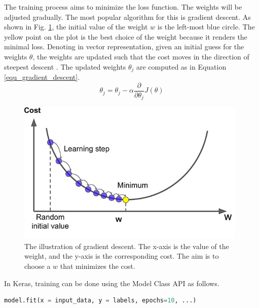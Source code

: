 The training process aims to minimize the loss function. The weights will be adjusted gradually. The most popular algorithm for this is gradient descent. As shown in Fig. \ref{fig_gradient_descent}, the initial value of the weight $w$ is the left-most blue circle. The yellow point on the plot is the best choice of the weight because it renders the minimal loss. Denoting in vector representation, given an initial guess for the weights $\theta$, the weights are updated such that the cost moves in the direction of steepest descent \cite{robbins1951stochastic}. The updated weights $\theta_j$ are computed as in Equation \ref{equ_gradient_descent}.
\begin{equation}
\theta_j=\theta_j - \alpha\frac{\partial}{\partial\theta_j}J(\theta)
 \label{equ_gradient_descent}
\end{equation}

\begin{figure}[h!]
\begin{center}
\includegraphics[width = 11cm]{img/gradient_descent.jpg}
\caption{The illustration of gradient descent. The x-axis is the value of the weight, and the y-axis is the corresponding cost. The aim is to choose a $w$ that minimizes the cost. \label{fig_gradient_descent}}
\end{center}
\end{figure}

In Keras, training can be done using the Model Class API as follows.
\begin{lstlisting}[language=python,frame=single]
model.fit(x = input_data, y = labels, epochs=10, ...)
\end{lstlisting}


